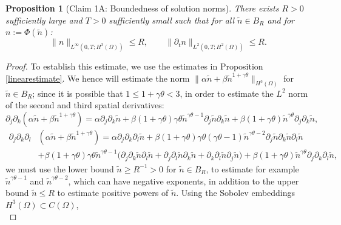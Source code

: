 \documentclass[12pt]{article}
\theoremstyle{plain}
\newtheorem{proposition}{Proposition}[section]
\begin{document}
\begin{proposition}[Claim 1A: Boundedness of solution norms]\label{1A}
    There exists $R > 0$ sufficiently large and $T > 0$ sufficiently small such that for all $\tilde{n} \in B_{R}$ and for $n := \Phi(\tilde{n})$:
    \begin{equation*}
        \|n\|_{L^{\infty}(0, T; H^{3}(\Omega))} \le R, \qquad \|\partial_{t}n\|_{L^{2}(0, T; H^{2}(\Omega))} \le R.
    \end{equation*}
\end{proposition}
\begin{proof}
To establish this estimate, we use the estimates in Proposition \ref{linearestimate}. We hence will estimate the norm $\|\alpha \tilde{n} + \beta \tilde{n}^{1 + \gamma \theta}\|_{H^{3}(\Omega)}$ for $\tilde{n} \in B_{R}$; since it is possible that $1 \le 1 + \gamma \theta < 3$, in order to estimate the $L^{2}$ norm of the second and third spatial derivatives:
\begin{equation*}
\partial_{j}\partial_{k}(\alpha \tilde{n} + \beta \tilde{n}^{1 + \gamma \theta}) = \alpha \partial_{j}\partial_{k} \tilde{n} + \beta (1 + \gamma \theta) \gamma \theta \tilde{n}^{\gamma \theta - 1} \partial_{j}\tilde{n} \partial_{k}\tilde{n} + \beta (1 + \gamma \theta) \tilde{n}^{\gamma \theta} \partial_{j}\partial_{k}\tilde{n},
\end{equation*}
\begin{align*}
\partial_{j}\partial_{k}\partial_{l}&(\alpha \tilde{n} + \beta \tilde{n}^{1 + \gamma \theta}) = \alpha \partial_{j}\partial_{k}\partial_{l}\tilde{n} + \beta(1 + \gamma \theta) \gamma \theta (\gamma \theta - 1) \tilde{n}^{\gamma \theta - 2} \partial_{j}\tilde{n} \partial_{k}\tilde{n} \partial_{l}\tilde{n} \\
&+ \beta (1 + \gamma \theta) \gamma \theta \tilde{n}^{\gamma \theta - 1} \Big(\partial_{j}\partial_{k} \tilde{n} \partial_{l}\tilde{n} + \partial_{j}\partial_{l}\tilde{n}\partial_{k}\tilde{n} + \partial_{k}\partial_{l}\tilde{n}\partial_{j}\tilde{n}\Big) + \beta (1 + \gamma \theta) \tilde{n}^{\gamma \theta} \partial_{j}\partial_{k}\partial_{l}\tilde{n},
\end{align*}
we must use the lower bound $\tilde{n} \ge R^{-1} > 0$ for $\tilde{n} \in B_{R}$, to estimate for example $\tilde{n}^{\gamma \theta - 1}$ and $\tilde{n}^{\gamma \theta - 2}$, which can have negative exponents, in addition to the upper bound $\tilde{n} \le R$ to estimate positive powers of $\tilde{n}$. Using the Sobolev embeddings $H^{3}(\Omega) \subset C(\Omega)$,
\begin{equation*}

\end{equation*}
\end{proof}
\end{document}
